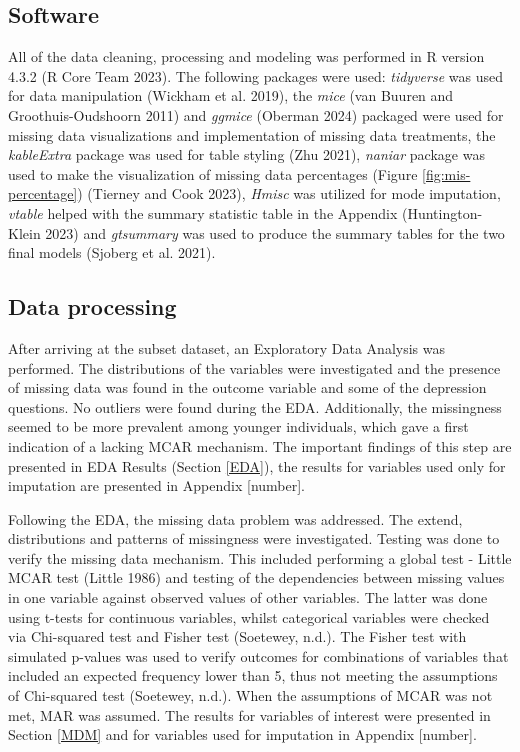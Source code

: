 \documentclass[
]{article}
\begin{document}
\hypertarget{software}{%
\subsection{Software}\label{software}}

All of the data cleaning, processing and modeling was performed in R version 4.3.2 (R Core Team 2023). The following packages were used: \emph{tidyverse} was used for data manipulation (Wickham et al. 2019), the \emph{mice} (van Buuren and Groothuis-Oudshoorn 2011) and \emph{ggmice} (Oberman 2024) packaged were used for missing data visualizations and implementation of missing data treatments, the \emph{kableExtra} package was used for table styling (Zhu 2021), \emph{naniar} package was used to make the visualization of missing data percentages (Figure \ref{fig:mis-percentage}) (Tierney and Cook 2023), \emph{Hmisc} was utilized for mode imputation, \emph{vtable} helped with the summary statistic table in the Appendix (Huntington-Klein 2023) and \emph{gtsummary} was used to produce the summary tables for the two final models (Sjoberg et al. 2021).

\hypertarget{data-proc}{%
\subsection{Data processing}\label{data-proc}}

After arriving at the subset dataset, an Exploratory Data Analysis was performed. The distributions of the variables were investigated and the presence of missing data was found in the outcome variable and some of the depression questions. No outliers were found during the EDA. Additionally, the missingness seemed to be more prevalent among younger individuals, which gave a first indication of a lacking MCAR mechanism. The important findings of this step are presented in EDA Results (Section \ref{EDA}), the results for variables used only for imputation are presented in Appendix {[}number{]}.

Following the EDA, the missing data problem was addressed. The extend, distributions and patterns of missingness were investigated. Testing was done to verify the missing data mechanism. This included performing a global test - Little MCAR test (Little 1986) and testing of the dependencies between missing values in one variable against observed values of other variables. The latter was done using t-tests for continuous variables, whilst categorical variables were checked via Chi-squared test and Fisher test (Soetewey, n.d.). The Fisher test with simulated p-values was used to verify outcomes for combinations of variables that included an expected frequency lower than 5, thus not meeting the assumptions of Chi-squared test (Soetewey, n.d.). When the assumptions of MCAR was not met, MAR was assumed. The results for variables of interest were presented in Section \ref{MDM} and for variables used for imputation in Appendix {[}number{]}.
\end{document}
